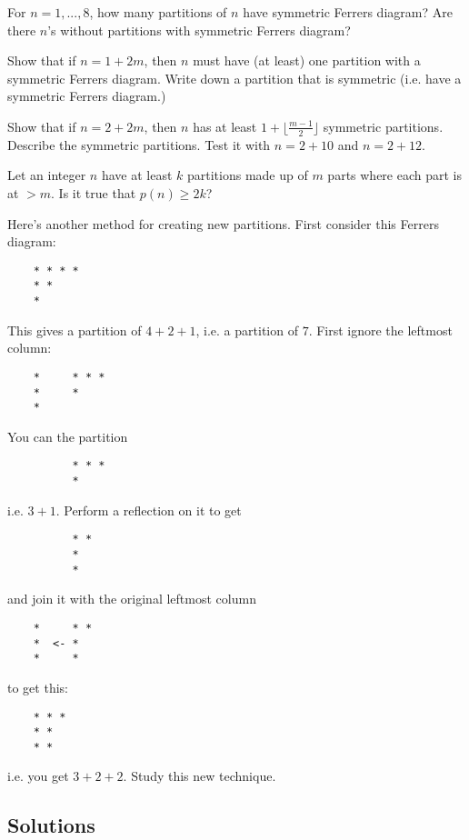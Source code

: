 \newpage
\begin{ex}
For $n=1, ..., 8$, how many partitions of $n$ have
symmetric Ferrers diagram?
Are there $n$'s without partitions with symmetric Ferrers diagram?
\end{ex}


\newpage
\begin{ex}
Show that if $n = 1 + 2m$, then $n$ must have (at least) one partition
with a symmetric Ferrers diagram.
Write down a partition that is symmetric (i.e. have a symmetric
Ferrers diagram.)
\end{ex}

%
%


\newpage
\begin{ex}
Show that if $n = 2 + 2m$,
then $n$ has at least $1 + \lfloor \frac{m-1}{2} \rfloor$
symmetric partitions. 
Describe the symmetric partitions.
Test it with $n = 2 + 10$ and $n = 2 + 12$.
\end{ex}

%
%
%


\newpage
\begin{ex}
Let an integer $n$ have at least $k$ partitions
made up of $m$ parts where each part is at $> m$.
Is it true that $p(n) \geq 2k$?
\end{ex}


\newpage
\begin{ex}
Here's another method for creating new partitions.
First consider this Ferrers diagram:
\begin{verbatim}
    * * * *
    * * 
    *
\end{verbatim}
This gives a partition of $4 + 2 + 1$, i.e. a partition of $7$.
First ignore the leftmost column:
\begin{verbatim}
    *     * * *
    *     * 
    *
\end{verbatim}
You can the partition 
\begin{verbatim}
          * * *
          * 
\end{verbatim}
i.e. $3 + 1$.
Perform a reflection on it to get
\begin{verbatim}
          * *
          *
          * 
\end{verbatim}
and join it with the original leftmost column 
\begin{verbatim}
    *     * *
    *  <- *   
    *     *
\end{verbatim}
to get this:
\begin{verbatim}
    * * *
    * *   
    * *
\end{verbatim}
i.e. you get $3 + 2 + 2$.
Study this new technique.
\end{ex}

\newpage
\subsection*{Solutions}


